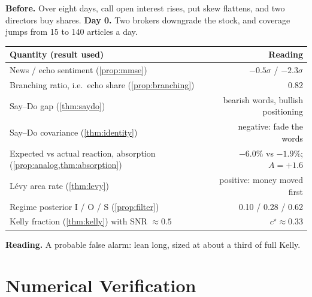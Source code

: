 \documentclass[11pt,a4paper]{article}
\theoremstyle{plain}
\theoremstyle{definition}
\theoremstyle{remark}
\begin{document}
\begin{tcolorbox}[enhanced,breakable,colback=gray!4,colframe=gray!55!black,boxrule=0.6pt,arc=2pt,
  fonttitle=\bfseries\small,title={Illustration: a hypothetical downgrade (numbers are illustrative, not data)},left=8pt,right=8pt]
\small
\textbf{Before.} Over eight days, call open interest rises, put skew flattens, and two directors buy shares. \textbf{Day 0.} Two brokers downgrade the stock, and coverage jumps from 15 to 140 articles a day.

\begin{tabularx}{\linewidth}{@{}Xr@{}}
\toprule
Quantity (result used) & Reading \\
\midrule
News / echo sentiment (\cref{prop:mmse}) & $-0.5\sigma$ / $-2.3\sigma$ \\
Branching ratio, i.e.\ echo share (\cref{prop:branching}) & 0.82 \\
Say--Do gap (\cref{thm:saydo}) & bearish words, bullish positioning \\
Say--Do covariance (\cref{thm:identity}) & negative: fade the words \\
Expected vs actual reaction, absorption (\cref{prop:analog,thm:absorption}) & $-6.0\%$ vs $-1.9\%$; $A=+1.6$ \\
L\'evy area rate (\cref{thm:levy}) & positive: money moved first \\
Regime posterior I / O / S (\cref{prop:filter}) & 0.10 / 0.28 / 0.62 \\
Kelly fraction (\cref{thm:kelly}) with SNR $\approx0.5$ & $c^\star\approx0.33$ \\
\bottomrule
\end{tabularx}

\textbf{Reading.} A probable false alarm: lean long, sized at about a third of full Kelly.
\end{tcolorbox}

\section{Numerical Verification}\label{sec:verify}
\end{document}
